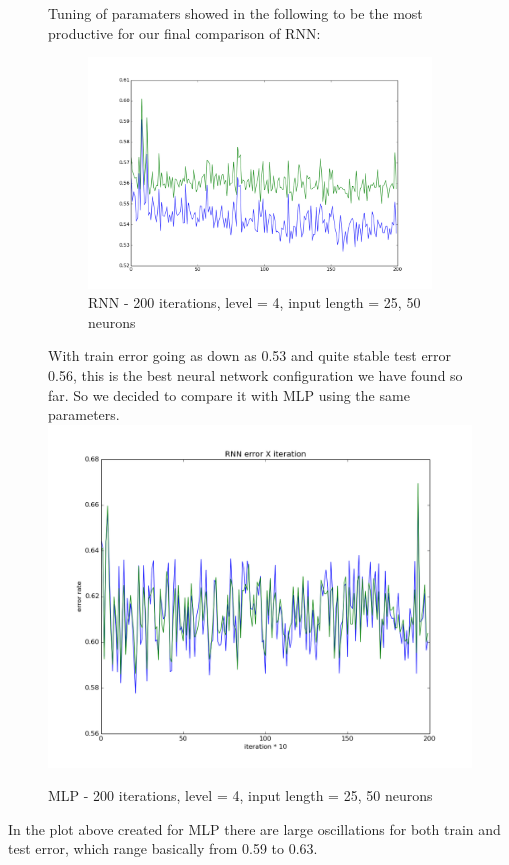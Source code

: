 \documentclass[twoside]{article}
\begin{document}
\begin{multicols}{2}
\begin{figure}[H]
Tuning of paramaters showed in the following to be the most productive for our final comparison of RNN:
\begin{figure}[H]
\centering
\includegraphics[scale=0.27]{../results/RNN_200iters_4level_25len_50hidden}
\caption{RNN - 200 iterations, level = 4, input length = 25, 50 neurons}
\label{ref:rnn}
\end{figure}
With train error going as down as 0.53 and quite stable test error 0.56, this is the best neural network configuration we have found so far.
So we decided to compare it with MLP using the same parameters.
\includegraphics[scale=0.29]{../results/MLP_200iters_4level_25len_50hidden}
\caption{MLP - 200 iterations, level = 4, input length = 25, 50 neurons}
\label{ref:rnn}
\end{figure}
In the plot above created for MLP there are large oscillations for both train and test error, which range basically from 0.59 to 0.63.


\end{multicols}
\end{document}
